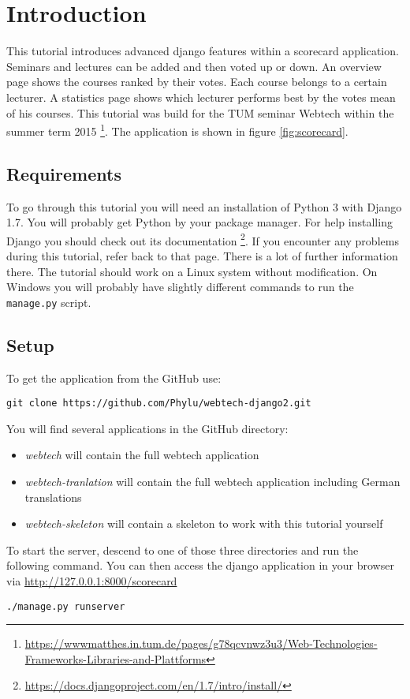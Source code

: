 \section{Introduction}

This tutorial introduces advanced django features within a scorecard application. Seminars and lectures can be added and then voted up or down. An overview page shows the courses ranked by their votes. Each course belongs to a certain lecturer. A statistics page shows which lecturer performs best by the votes mean of his courses. This tutorial was build for the TUM seminar Webtech within the summer term 2015 \footnote{\url{https://wwwmatthes.in.tum.de/pages/g78qcvnwz3u3/Web-Technologies-Frameworks-Libraries-and-Plattforms}}. The application is shown in figure \ref{fig:scorecard}.


\subsection{Requirements}

To go through this tutorial you will need an installation of Python 3 with Django 1.7. You will probably get Python by your package manager. For help installing Django you should check out its documentation \footnote{\url{https://docs.djangoproject.com/en/1.7/intro/install/}}. If you encounter any problems during this tutorial, refer back to that page. There is a lot of further information there. The tutorial should work on a Linux system without modification. On Windows you will probably have slightly different commands to run the \lstinline|manage.py| script.

\subsection{Setup}

To get the application from the GitHub use:
\begin{lstlisting}[style=Bash, caption=Clone application, label=lst:clone_app]
git clone https://github.com/Phylu/webtech-django2.git
\end{lstlisting}

You will find several applications in the GitHub directory:
\begin{itemize}
 \item \emph{webtech} will contain the full webtech application
 \item \emph{webtech-tranlation} will contain the full webtech application including German translations
 \item \emph{webtech-skeleton} will contain a skeleton to work with this tutorial yourself
\end{itemize}

To start the server, descend to one of those three directories and run the following command. You can then access the django application in your browser via \url{http://127.0.0.1:8000/scorecard}
\begin{lstlisting}[style=Bash, caption=Run development server, label=lst:run_server]
./manage.py runserver
\end{lstlisting}